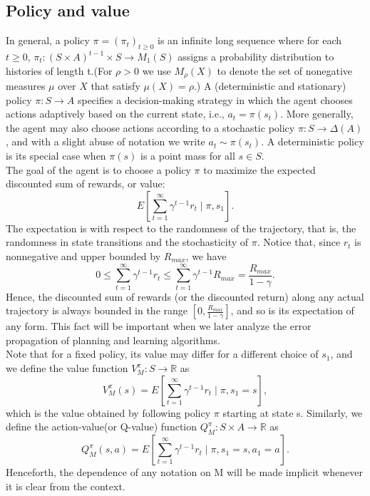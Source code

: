 \documentclass{report}
\begin{document}
\subsection{Policy and value}
In general, a policy $\pi=(\pi_t)_{t\geq 0}$ is an infinite long sequence where for each $t \geq 0$, $\pi_t:(S\times A)^{t-1} \times S \rightarrow M_1(S)$ assigns a probability distribution to histories of length t.(For $\rho > 0$ we use $M_{\rho}(X)$ to denote the set of nonegative measures $\mu$ over $X$ that satisfy $\mu(X)=\rho$.)
A (deterministic and stationary) policy $\pi:S\rightarrow A$ specifies a decision-making strategy in which the agent chooses actions adaptively based on the current state, i.e., $a_t = \pi(s_t)$. More generally, the agent may also choose actions according to a stochastic policy $\pi:S\rightarrow \Delta(A)$, and with a slight abuse of notation we write $a_t \sim \pi(s_t)$. A deterministic policy is its special case when $\pi(s)$ is a point mass for all $s\in S$. \\
The goal of the agent is to choose a policy $\pi$ to maximize the expected discounted sum of rewards, or value:
\begin{equation}
    E[\sum_{t=1}^{\infty}\gamma^{t-1}r_t\mid \pi,s_1].
\end{equation}
The expectation is with respect to the randomness of the trajectory, that is, the randomness in state transitions and the stochasticity of $\pi$. Notice that, since $r_t$ is nonnegative and upper bounded by $R_{max}$, we have
\begin{equation}
    0 \leq \sum_{t=1}^{\infty}\gamma^{t-1}r_t \leq \sum_{t=1}^{\infty}\gamma^{t-1}R_{max}=\frac{R_{max}}{1-\gamma}.
\end{equation}
Hence, the discounted sum of rewards (or the discounted return) along any actual trajectory is always
bounded in the range $[0,\frac{R_{max}}{1-\gamma}]$, and so is its expectation of any form. This fact will be important when we later analyze the error propagation of planning and learning algorithms.\\
Note that for a fixed policy, its value may differ for a different choice of $s_1$, and we define the value function $V_{M}^{\pi}:S \rightarrow \mathbb{R}$ as 
\[
V_{M}^{\pi}(s)=E[\sum_{t=1}^{\infty}\gamma^{t-1}r_t\mid \pi, s_1=s],
\]
which is the value obtained by following policy $\pi$ starting at state s. Similarly, we define the action-value(or Q-value) function $Q_M^{\pi}:S\times A \rightarrow \mathbb{R}$ as 
\[
Q_M^{\pi}(s,a)=E[\sum_{t=1}^{\infty}\gamma^{t-1}r_t\mid \pi, s_1=s,a_1=a].
\]
Henceforth, the dependence of any notation on M will be made implicit whenever it is clear from the context.
\end{document}
